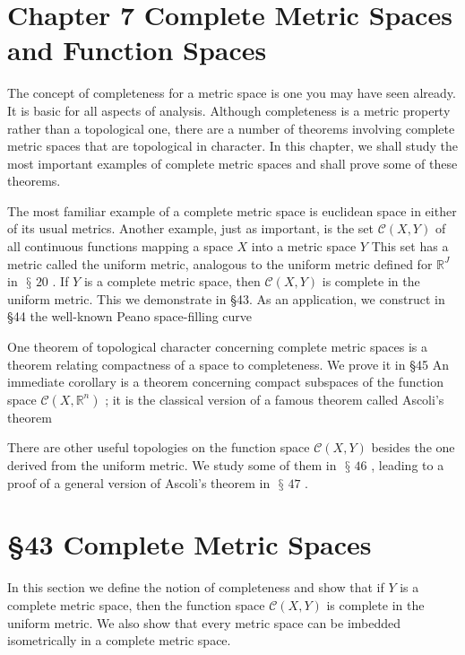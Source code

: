 \documentclass[10pt]{article}
\begin{document}
\section*{Chapter 7 Complete Metric Spaces and Function Spaces}

The concept of completeness for a metric space is one you may have seen already. It is basic for all aspects of analysis. Although completeness is a metric property rather than a topological one, there are a number of theorems involving complete metric spaces that are topological in character. In this chapter, we shall study the most important examples of complete metric spaces and shall prove some of these theorems.

The most familiar example of a complete metric space is euclidean space in either of its usual metrics. Another example, just as important, is the set \(\mathcal{C}\left( {X,Y}\right)\) of all continuous functions mapping a space \(X\) into a metric space \(Y\) This set has a metric called the uniform metric, analogous to the uniform metric defined for \({\mathbb{R}}^{J}\) in \(\text{ § }{20}\) . If \(Y\) is a complete metric space, then \(\mathcal{C}\left( {X,Y}\right)\) is complete in the uniform metric. This we demonstrate in §43. As an application, we construct in §44 the well-known Peano space-filling curve

One theorem of topological character concerning complete metric spaces is a theorem relating compactness of a space to completeness. We prove it in §45 An immediate corollary is a theorem concerning compact subspaces of the function space \(\mathcal{C}\left( {X,{\mathbb{R}}^{n}}\right)\) ; it is the classical version of a famous theorem called Ascoli’s theorem

There are other useful topologies on the function space \(\mathcal{C}\left( {X,Y}\right)\) besides the one derived from the uniform metric. We study some of them in \(\text{ § }{46}\) , leading to a proof of a general version of Ascoli's theorem in \(\text{ § }{47}\) .

\section*{§43 Complete Metric Spaces}

In this section we define the notion of completeness and show that if \(Y\) is a complete metric space, then the function space \(\mathcal{C}\left( {X,Y}\right)\) is complete in the uniform metric. We also show that every metric space can be imbedded isometrically in a complete metric space.
\end{document}
